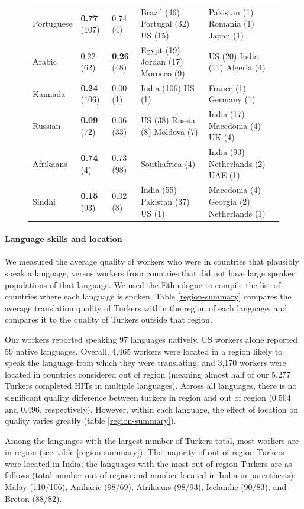 \documentclass[11pt]{article}
\begin{document}
\begin{figure}[h]
\begin{tabular}{lllll}
Portuguese&\textbf{0.77} (107)&0.74 (4)&Brazil (46) Portugal (32) US (15) &Pakistan (1) Romania (1) Japan (1) \\
Arabic&0.22 (62) &\textbf{0.26} (48)&Egypt (19) Jordan (17) Morocco (9) &US (20) India (11) Algeria (4) \\
Kannada&\textbf{0.24} (106)&0.00 (1)&India (106) US (1) &France (1) Germany (1) \\
Russian&\textbf{0.09} (72)&0.06 (33)&US (38) Russia (8) Moldova (7) &India (17) Macedonia (4) UK (4) \\
Afrikaans&\textbf{0.74} (4)&0.73 (98)&Southafrica (4) &India (93) Netherlands (2) UAE (1) \\
Sindhi&\textbf{0.15} (93)&0.02 (8)&India (55) Pakistan (37) US (1) &Macedonia (4) Georgia (2) Netherlands (1) \\
\hline\hline
\end{tabular}
\end{figure}


\paragraph{Language skills and location}

We measured the average quality of workers who were in countries that plausibly speak a language, versus workers from countries that did not have large speaker populations of that language.  We used the Ethnologue \cite{ethnologue} to compile the list of countries where each language is spoken.  Table \ref{region-summary} compares the average translation quality of Turkers within the region of each language, and compares it to the quality of Turkers outside that region. 

Our workers reported speaking 97 languages natively. US workers alone reported 59 native languages. Overall, 4,465 workers were located in a region likely to speak the language from which they were translating, and 3,170 workers were located in countries considered out of region (meaning almost half of our 5,277 Turkers completed HITs in multiple languages). Across all languages, there is no significant quality difference between turkers in region and out of region (0.504 and 0.496, respectively). However, within each language, the effect of location on quality varies greatly (table \ref{region-summary}). 

Among the languages with the largest number of Turkers total, most workers are in region (see table \ref{region-summary}). The majority of out-of-region Turkers were located in India; the languages with the most out of region Turkers are as follows (total number out of region and number located in India in parenthesis): Malay (110/106), Amharic (98/69), Afrikaans (98/93), Icelandic (90/83), and Breton (88/82).
\end{document}
